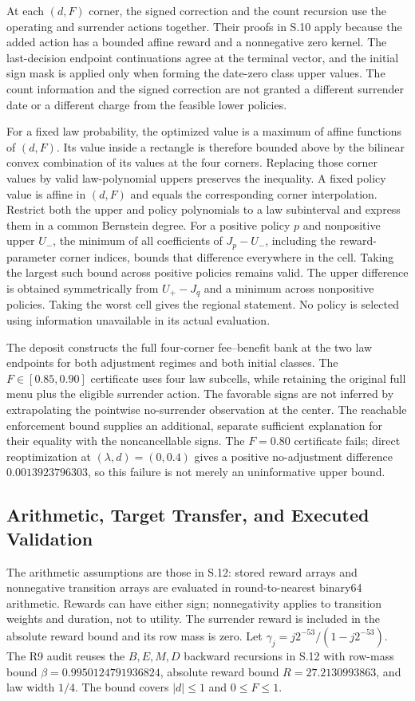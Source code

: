 At each $(d,F)$ corner, the signed correction and the count recursion use the operating and surrender actions together. Their proofs in S.10 apply because the added action has a bounded affine reward and a nonnegative zero kernel. The last-decision endpoint continuations agree at the terminal vector, and the initial sign mask is applied only when forming the date-zero class upper values. The count information and the signed correction are not granted a different surrender date or a different charge from the feasible lower policies.

For a fixed law probability, the optimized value is a maximum of affine functions of $(d,F)$. Its value inside a rectangle is therefore bounded above by the bilinear convex combination of its values at the four corners. Replacing those corner values by valid law-polynomial uppers preserves the inequality. A fixed policy value is affine in $(d,F)$ and equals the corresponding corner interpolation. Restrict both the upper and policy polynomials to a law subinterval and express them in a common Bernstein degree. For a positive policy $p$ and nonpositive upper $U_-$, the minimum of all coefficients of $J_p-U_-$, including the reward-parameter corner indices, bounds that difference everywhere in the cell. Taking the largest such bound across positive policies remains valid. The upper difference is obtained symmetrically from $U_+-J_q$ and a minimum across nonpositive policies. Taking the worst cell gives the regional statement. No policy is selected using information unavailable in its actual evaluation.

The deposit constructs the full four-corner fee--benefit bank at the two law endpoints for both adjustment regimes and both initial classes. The $F\in[0.85,0.90]$ certificate uses four law subcells, while retaining the original full menu plus the eligible surrender action. The favorable signs are not inferred by extrapolating the pointwise no-surrender observation at the center. The reachable enforcement bound supplies an additional, separate sufficient explanation for their equality with the noncancellable signs. The $F=0.80$ certificate fails; direct reoptimization at $(\lambda,d)=(0,0.4)$ gives a positive no-adjustment difference $0.0013923796303$, so this failure is not merely an uninformative upper bound.

\subsection{Arithmetic, Target Transfer, and Executed Validation}
The arithmetic assumptions are those in S.12: stored reward arrays and nonnegative transition arrays are evaluated in round-to-nearest binary64 arithmetic. Rewards can have either sign; nonnegativity applies to transition weights and duration, not to utility. The surrender reward is included in the absolute reward bound and its row mass is zero. Let $\gamma_j=j2^{-53}/(1-j2^{-53})$. The R9 audit reuses the $B,E,M,D$ backward recursions in S.12 with row-mass bound $\beta=0.9950124791936824$, absolute reward bound $R=27.2130993863$, and law width $1/4$. The bound covers $|d|\leq1$ and $0\leq F\leq1$.

